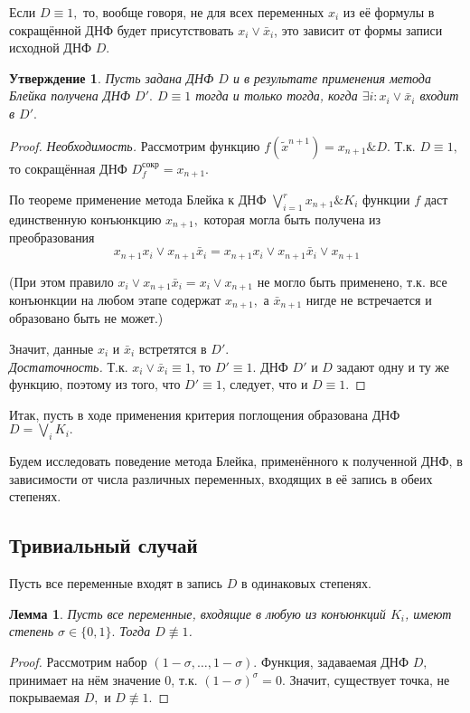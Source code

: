 \documentclass[12pt,a4paper,oneside,fleqn,leqno]{article}
\newtheorem{statement}{Утверждение}
\newtheorem{lemma}{Лемма}
\theoremstyle{definition}
\begin{document}
		Если $D \equiv 1,$ то, вообще говоря, не для всех переменных $x_i$ из её формулы в сокращённой ДНФ будет присутствовать $x_i \vee \bar{x}_i$, это зависит от формы записи исходной ДНФ $D.$\par
		\begin{statement}
			Пусть задана ДНФ $D$ и в результате применения метода Блейка получена ДНФ $D'.$ $D \equiv 1$ тогда и только тогда, когда $\exists i: x_i \vee \bar{x}_i$ входит в $D'.$
		\end{statement}
		\begin{proof}
			\textit{Необходимость.} Рассмотрим функцию $f(\tilde x^{n+1}) = x_{n + 1} \& D.$ Т.к. $D \equiv 1,$ то сокращённая ДНФ $D_f^{\text{сокр}} = x_{n + 1}.$\par
			По теореме применение метода Блейка к ДНФ $\bigvee\limits_{i = 1}^r x_{n + 1} \& K_i$ функции $f$ даст единственную конъюнкцию $x_{n + 1},$ которая могла быть получена из преобразования
			$$
				x_{n + 1} x_i \vee x_{n + 1} \bar{x}_i = x_{n + 1} x_i \vee x_{n + 1} \bar{x}_i \vee x_{n + 1}
			$$\par
			(При этом правило $x_i \vee x_{n + 1} \bar{x}_i = x_i \vee x_{n + 1}$ не могло быть применено, т.к. все конъюнкции на любом этапе содержат $x_{n + 1},$ а $\bar{x}_{n + 1}$ нигде не встречается и образовано быть не может.)\par
			Значит, данные $x_i$ и $\bar{x}_i$ встретятся в $D'.$\\
		\textit{Достаточность.} Т.к. $x_i \vee \bar{x}_i \equiv 1$, то $D' \equiv 1$. ДНФ $D'$ и $D$ задают одну и ту же функцию, поэтому из того, что $D' \equiv 1$, следует, что и $D \equiv 1.$
		\end{proof}\par
		Итак, пусть в ходе применения критерия поглощения образована ДНФ $D = \bigvee\limits_iK_i.$\par
		Будем исследовать поведение метода Блейка, применённого к полученной ДНФ, в зависимости от числа различных переменных, входящих в её запись в обеих степенях.\par
		\subsection{Тривиальный случай}
			Пусть все переменные входят в запись $D$ в одинаковых степенях.\par
			\begin{lemma}
				Пусть все переменные, входящие в любую из конъюнкций $K_i$, имеют степень $\sigma \in \{ 0, 1\}.$ Тогда $D \not\equiv 1$.
			\end{lemma}
			\begin{proof}
				Рассмотрим набор $(1 - \sigma, \ldots, 1 - \sigma).$ Функция, задаваемая ДНФ $D,$ принимает на нём значение 0, т.к. $(1 - \sigma)^{\sigma} = 0.$ Значит, существует точка, не покрываемая $D,$ и $D \not\equiv 1$.
			\end{proof}
\end{document}
